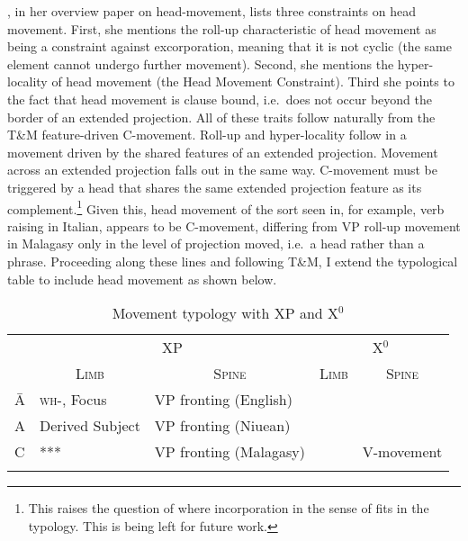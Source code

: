 \documentclass[output=paper,colorlinks,citecolor=brown,
]{langscibook}
\begin{document}
\citet{Dekany:2018}, in her overview paper on head-movement, lists three constraints on head movement.  First,  she mentions the roll-up characteristic of head movement as being a constraint against excorporation, meaning that it is not cyclic (the same element cannot undergo further movement).   Second, she mentions the hyper-locality of head movement (the Head Movement Constraint).  Third she points to the fact that head movement is clause bound, i.e.\ does not occur beyond the border of an extended projection.  All of these traits follow naturally from the T\&M feature-driven C-movement.  Roll-up and hyper-locality follow in a movement driven by the shared features of an extended projection.  Movement across an extended projection  falls out in the same way.  C-movement must be triggered by a head that shares the same extended projection feature as its complement.\footnote{This raises the question of where incorporation in the sense of \citet{Baker:1988c} fits in the typology.  This is being left for future work.}  Given this, head movement of the sort seen in, for example, verb raising in Italian, appears to be C-movement, differing from VP roll-up movement in Malagasy only in the level of projection moved, i.e.\ a head rather than a phrase.  Proceeding along these lines and following T\&M, I extend the typological table to include head movement as shown below.

\begin{table}
\caption{Movement typology with XP and X$^0$\label{tab:table}}
\begin{tabular}{ l  l  l  l  l }
\lsptoprule
& \multicolumn{2}{c}{XP} & \multicolumn{2}{c}{X$^0$} \\\cmidrule(lr){2-3}\cmidrule(lr){4-5}
&\multicolumn{1}{c}{\textsc{Limb}} & \multicolumn{1}{c}{\textsc{Spine}} & \multicolumn{1}{c}{\textsc{Limb}} & \multicolumn{1}{c}{\textsc{Spine}} \\\midrule
\=A & \cellcolor{Gray}\textsc{wh-}, Focus & VP fronting (English) &  &  \\
A  & \cellcolor{Gray}Derived Subject&  VP fronting (Niuean)   &  &  \\
C  & ***  &    VP fronting (Malagasy) &  &  \cellcolor{Gray} V-movement\\
\lspbottomrule
\end{tabular}
\end{table}
\end{document}

